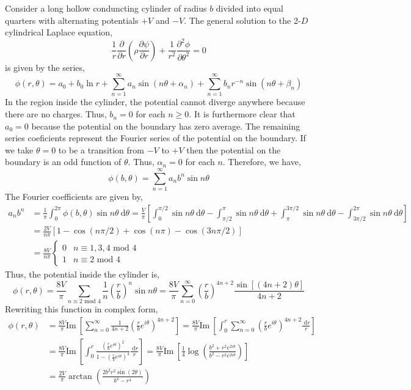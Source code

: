 \documentclass[12pt]{extarticle}
\renewcommand{\Im}[1]{\mathrm{Im} \: #1}
\renewcommand{\d}[1]{\: \mathrm{d}#1}
\newcommand{\pderiv}[2]{\frac{\partial{#1}}{\partial{#2}}}
\newcommand{\parsq}[2]{\frac{\partial^2{#1}}{\partial{#2}^2}}
\theoremstyle{definition}
\begin{document}
Consider a long hollow conduncting cylinder of radius $b$ divided into equal quarters with alternating potentials $+V$ and $-V$. The general solution to the 2-$D$ cylindrical Laplace equation,
\[ \frac{1}{r} \pderiv{}{r} \left( \rho \pderiv{\psi}{r} \right) + \frac{1}{r^2} \parsq{\phi}{\theta}  = 0 \]
is given by the series,
\[ \phi(r, \theta) = a_0 + b_0 \ln{r} + \sum_{n = 1}^\infty a_n \sin{(n \theta + \alpha_n)} + \sum_{n = 1}^\infty b_n r^{-n} \sin{(n \theta + \beta_n)} \]
In the region inside the cylinder, the potential cannot diverge anywhere because there are no charges. Thus, $b_n = 0$ for each $n \ge 0$. It is furthermore clear that $a_0 = 0$ because the potential on the boundary has zero average. The remaining series coeficients represent the Fourier series of the potential on the boundary. If we take $\theta = 0$ to be a transition from $-V$ to $+V$ then the potential on the boundary is an odd function of $\theta$. Thus, $\alpha_n = 0$ for each $n$. Therefore, we have,
\[ \phi(b, \theta) = \sum_{n = 1}^\infty a_n b^n \sin{n \theta} \]
The Fourier coefficients are given by, 
\begin{align*}
a_n b^n & = \frac{1}{\pi} \int_0^{2 \pi} \phi(b, \theta) \sin{n\theta} \d{\theta} = \frac{V}{\pi} \left[ \int_0^{\pi/2} \sin{n\theta} \d{\theta} - \int_{\pi/2}^{\pi} \sin{n\theta} \d{\theta} + \int_{\pi}^{3\pi/2} \sin{n\theta} \d{\theta} - \int_{3 \pi /2}^{2\pi} \sin{n\theta} \d{\theta} \right] 
\\
& = \frac{2V}{n \pi} \left[1 - \cos{(n \pi / 2)} + \cos{(n \pi)} - \cos{(3 n \pi / 2)}   \right] 
\\
& = \frac{8 V}{n \pi} 
\begin{cases}
0 & n \equiv 1,3,4 \text{ mod } 4
\\
1 & n \equiv 2 \text{ mod } 4
\end{cases}
\end{align*}
Thus, the potential inside the cylinder is,
\[ \phi(r, \theta) = \frac{8 V}{\pi} \sum_{n \equiv 2 \text{ mod } 4} \frac{1}{n} \left( \frac{r}{b} \right)^n \sin{n \theta} = \frac{8 V}{\pi} \sum_{n = 0}^\infty \left( \frac{r}{b} \right)^{4n + 2} \frac{\sin{[(4 n + 2) \theta]}}{4 n + 2} \]
Rewriting this function in complex form,
\begin{align*}
\phi(r, \theta) & = \frac{8 V}{\pi} \Im{\left[ \sum_{n = 0}^{\infty} \frac{1}{4 n + 2} \left( \frac{r}{b} e^{i \theta} \right)^{4 n + 2}  \right]} = \frac{8 V}{\pi} \Im{\left[ \int_0^r \sum_{n = 0}^{\infty} \left( \frac{r}{b} e^{i \theta} \right)^{4 n + 2} \frac{\d{r}}{r}  \right]}
\\
& = \frac{8 V}{\pi} \Im{\left[ \int_0^r \frac{\left( \frac{r}{b} e^{i \theta} \right)^2}{1 - \left( \frac{r}{b} e^{i \theta} \right)^4} \frac{\d{r}}{r}  \right]}
= \frac{8 V}{\pi} \Im{\left[ \frac{1}{4} \log{\left(\frac{b^2 + r^2 e^{2 i \theta}}{ b^2 - r^2 e^{2 i \theta}} \right)} \right]}
\\
& = \frac{2 V}{\pi} \arctan{ \left( \frac{2 b^2 r^2 \sin{(2 \theta)}}{b^4 - r^4} \right) }
\end{align*}
\end{document}
